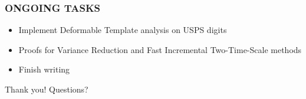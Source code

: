 \documentclass[10pt]{beamer}
\begin{document}
\begin{frame}
\frametitle{ONGOING TASKS}
\begin{itemize}
\item Implement Deformable Template analysis on USPS digits
\item Proofs for Variance Reduction and Fast Incremental Two-Time-Scale methods
\item Finish writing
\end{itemize}
\end{frame}



\begin{frame}

\vfill
\begin{center}

{\huge Thank you! Questions?}\vspace{.3cm}

\end{center}

\vfill

\end{frame}
%
%
%
%
%
%
\end{document}

